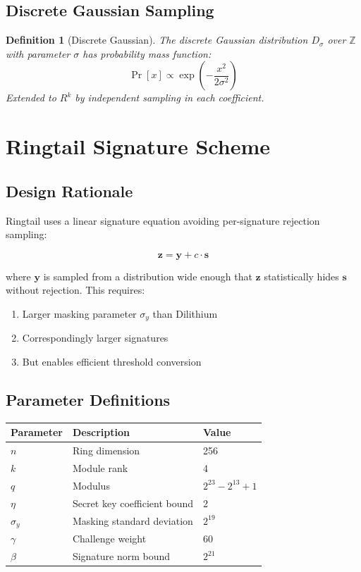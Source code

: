 \documentclass[11pt,a4paper]{article}
\newtheorem{definition}[theorem]{Definition}
\begin{document}
\subsection{Discrete Gaussian Sampling}

\begin{definition}[Discrete Gaussian]
The discrete Gaussian distribution $D_{\sigma}$ over $\mathbb{Z}$ with parameter $\sigma$ has probability mass function:
\[
\Pr[x] \propto \exp\left(-\frac{x^2}{2\sigma^2}\right)
\]
Extended to $R^k$ by independent sampling in each coefficient.
\end{definition}

\section{Ringtail Signature Scheme}

\subsection{Design Rationale}

Ringtail uses a linear signature equation avoiding per-signature rejection sampling:

\[
\mathbf{z} = \mathbf{y} + c \cdot \mathbf{s}
\]

where $\mathbf{y}$ is sampled from a distribution wide enough that $\mathbf{z}$ statistically hides $\mathbf{s}$ without rejection. This requires:
\begin{enumerate}
    \item Larger masking parameter $\sigma_y$ than Dilithium
    \item Correspondingly larger signatures
    \item But enables efficient threshold conversion
\end{enumerate}

\subsection{Parameter Definitions}

\begin{center}
\begin{tabular}{|l|l|l|}
\hline
\textbf{Parameter} & \textbf{Description} & \textbf{Value} \\
\hline
$n$ & Ring dimension & 256 \\
$k$ & Module rank & 4 \\
$q$ & Modulus & $2^{23} - 2^{13} + 1$ \\
$\eta$ & Secret key coefficient bound & 2 \\
$\sigma_y$ & Masking standard deviation & $2^{19}$ \\
$\gamma$ & Challenge weight & 60 \\
$\beta$ & Signature norm bound & $2^{21}$ \\
\hline
\end{tabular}
\end{center}
\end{document}
